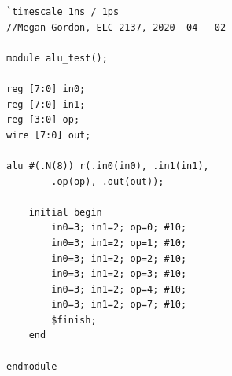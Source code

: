 \documentclass[11pt]{article}
\begin{document}
\begin{lstlisting}[style=Verilog,caption=ALU Test Bench Code,label=code:ex ]
`timescale 1ns / 1ps
//Megan Gordon, ELC 2137, 2020 -04 - 02

module alu_test();

reg [7:0] in0;
reg [7:0] in1;
reg [3:0] op;
wire [7:0] out;

alu #(.N(8)) r(.in0(in0), .in1(in1), 
		.op(op), .out(out));

	initial begin
		in0=3; in1=2; op=0; #10;
		in0=3; in1=2; op=1; #10;
		in0=3; in1=2; op=2; #10;
		in0=3; in1=2; op=3; #10;
		in0=3; in1=2; op=4; #10;
		in0=3; in1=2; op=7; #10;
		$finish;
	end

endmodule
\end{lstlisting}
\end{document}
